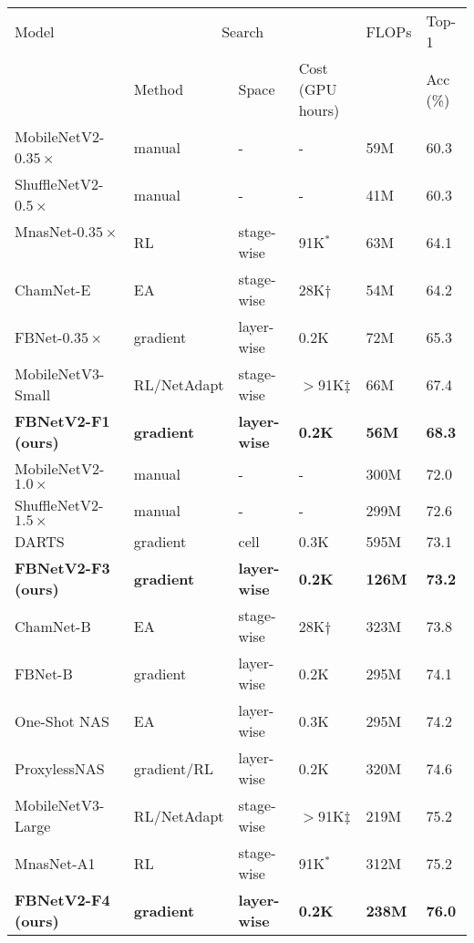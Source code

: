 \documentclass[10pt,twocolumn,letterpaper]{article}
\begin{document}
\begin{table*}[t]
\small
\centering
\begin{tabular*}{\textwidth}{l @{\extracolsep{\fill}} lllll}
\toprule
Model & \multicolumn{3}{c}{Search} & FLOPs & Top-1 \\ 
 \cmidrule{2-4}
 & Method & Space & Cost (GPU hours) & & Acc (\%) \\
\midrule
MobileNetV2-$0.35\times$~\cite{mobilenetv2} & manual & - & - & 59M & 60.3 \\
ShuffleNetV2-$0.5\times$~\cite{shufflenetv2} & manual  & - & - & 41M  & 60.3 \\
MnasNet-$0.35\times$~\cite{mnasnet} & RL  & stage-wise & 91K$^*$ & 63M & 64.1    \\
ChamNet-E~\cite{chamnet}& EA & stage-wise  & 28K$\dag$ & 54M & 64.2 \\
FBNet-$0.35\times$~\cite{fbnet}  & gradient & layer-wise  & 0.2K  & 72M & 65.3 \\ 
MobileNetV3-Small~\cite{mobilenetv3} & RL/NetAdapt & stage-wise & $>$91K$\ddag$  & 66M & 67.4 \\
\textbf{FBNetV2-F1 (ours)} & \textbf{gradient} & \textbf{layer-wise}  & \textbf{0.2K} & \textbf{56M}    & \textbf{68.3}   \\ \hline
MobileNetV2-$1.0\times$ \cite{mobilenetv2} & manual & - & - & 300M & 72.0 \\
ShuffleNetV2-$1.5\times$ \cite{shufflenetv2} & manual  & - & - & 299M    & 72.6 \\
DARTS  \cite{darts}  & gradient & cell & 0.3K & 595M & 73.1   \\ 
\textbf{FBNetV2-F3 (ours)} & \textbf{gradient} & \textbf{layer-wise}  & \textbf{0.2K} & \textbf{126M} & \textbf{73.2}   \\
\hline
ChamNet-B~\cite{chamnet}& EA & stage-wise  & 28K$\dag$ & 323M & 73.8 \\
FBNet-B~\cite{fbnet} & gradient & layer-wise & 0.2K & 295M & 74.1 \\
One-Shot NAS~\cite{one-shot} & EA & layer-wise & 0.3K & 295M & 74.2 \\
ProxylessNAS~\cite{proxylessnas} & gradient/RL  & layer-wise & 0.2K & 320M & 74.6 \\
MobileNetV3-Large~\cite{mobilenetv3} & RL/NetAdapt & stage-wise & $>$91K$\ddag$ & 219M & 75.2 \\
MnasNet-A1 \cite{mnasnet} & RL  & stage-wise & 91K$^*$ & 312M & 75.2    \\ 
\textbf{FBNetV2-F4 (ours)} & \textbf{gradient} & \textbf{layer-wise}  & \textbf{0.2K} & \textbf{238M} & \textbf{76.0}   \\ \hline

\end{tabular*}
\end{table*}
\end{document}
